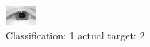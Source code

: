 \begin{figure}[h!]
\begin{center}
\includegraphics[width=0.60\columnwidth]{figures/ID2302_class_1_target_2.png}
\end{center}
\caption{ Classification: 1 actual target: 2}
\label{fig:ID2302_class_1_target_2}
\end{figure}
